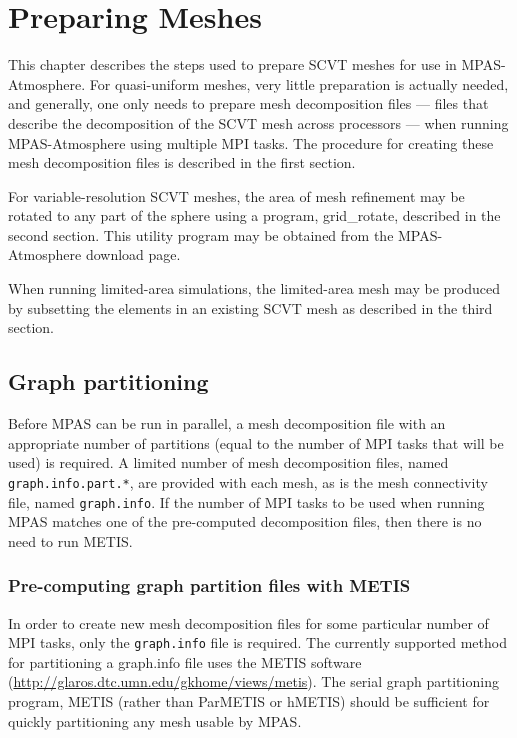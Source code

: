 \chapter{Preparing Meshes}
\label{chap:mpas_grid_preparation}

This chapter describes the steps used to prepare SCVT meshes for use in MPAS-Atmosphere.
For quasi-uniform meshes, very little preparation is actually needed, and
generally, one only needs to prepare mesh decomposition files --- files that
describe the decomposition of the SCVT mesh across processors --- when running
MPAS-Atmosphere using multiple MPI tasks. The procedure for creating these mesh
decomposition files is described in the first section. 

For variable-resolution SCVT meshes, the area of mesh refinement may be rotated
to any part of the sphere using a program, grid\_rotate, described in the second
section. This utility program may be obtained from the MPAS-Atmosphere download page.

When running limited-area simulations, the limited-area mesh may be produced by
subsetting the elements in an existing SCVT mesh as described in the third section.

\section{Graph partitioning}
Before MPAS can be run in parallel, a mesh decomposition file with an
appropriate number of partitions (equal to the number of MPI tasks that will be
used) is required. A limited number of mesh decomposition files, named {\tt
graph.info.part.*}, are provided with each mesh, as is the mesh
connectivity file, named {\tt graph.info}. If the number of MPI tasks to be used when
running MPAS matches one of the pre-computed decomposition files, then there
is no need to run METIS.
\subsection{Pre-computing graph partition files with METIS} 
\label{sec:metis}

In order to create new mesh decomposition files for some particular number of MPI tasks, 
only the {\tt graph.info} file is required.  The currently supported method for partitioning
a graph.info file uses the METIS software
(\url{http://glaros.dtc.umn.edu/gkhome/views/metis}).  The serial graph partitioning
program, METIS (rather than ParMETIS or hMETIS) should be sufficient for
quickly partitioning any mesh usable by MPAS.

